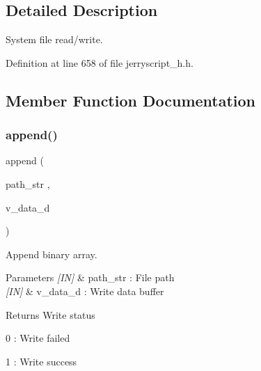 \subsection{Detailed Description}
System file read/write. 

Definition at line 658 of file jerryscript\+\_\+h.\+h.



\subsection{Member Function Documentation}
\mbox{\label{classfile_a4da87c8186e3a0272184a8c45a781fb4}} 
\subsubsection{append()\hspace{0.1cm}{\footnotesize\ttfamily [1/2]}}
{\footnotesize\ttfamily append (\begin{DoxyParamCaption}\item[{path\+\_\+str}]{,  }\item[{v\+\_\+data\+\_\+d}]{ }\end{DoxyParamCaption})}



Append binary array. 


\begin{DoxyCode}{0}
\end{DoxyCode}



\begin{DoxyParams}{Parameters}
{\em \mbox{[}\+I\+N\mbox{]}} & path\+\_\+str \+: File path \\
\hline
{\em \mbox{[}\+I\+N\mbox{]}} & v\+\_\+data\+\_\+d \+: Write data buffer \\
\hline
\end{DoxyParams}
\begin{DoxyReturn}{Returns}
Write status \begin{DoxyItemize}
\item 0 \+: Write failed \item 1 \+: Write success \end{DoxyItemize}

\end{DoxyReturn}
\mbox{\label{classfile_ab1a8d867119100f7ac4367fd12aa6a27}} 
